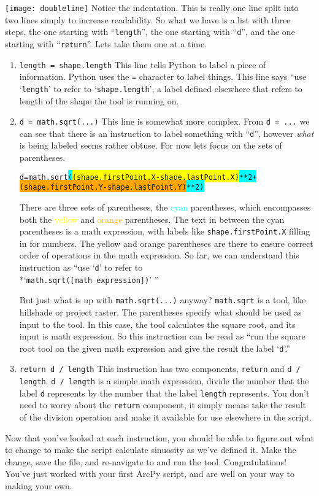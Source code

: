 \documentclass{article}
\begin{document}
\noindent
\texttt{[image: doubleline]}
Notice the indentation.  This is really one line split into two lines simply to increase readability.  So what we have is a list with three steps, the one starting with ``\verb+length+'', the one starting with ``\verb+d+'', and the one starting with ``\verb+return+''.  Lets take them one at a time.
\begin{enumerate}
    \item \verb+length = shape.length+
        This line tells Python to label a piece of information.  Python uses the \verb+=+ character to label things.  This line says ``use `\verb+length+' to refer to `\verb+shape.length+', a label defined elsewhere that refers to length of the shape the tool is running on.  
    \item \verb+d = math.sqrt(...)+
        This line is somewhat more complex.  From \verb+d = ...+ we can see that there is an instruction to label something with ``\verb+d+'', however \textit{what} is being labeled seems rather obtuse.  For now lets focus on the sets of parentheses.  
        \begin{alltt}
d = math.sqrt\colorbox{cyan}{(\colorbox{yellow}{(shape.firstPoint.X - shape.lastPoint.X)} ** 2 +}
              \colorbox{cyan}{\colorbox{orange}{(shape.firstPoint.Y - shape.lastPoint.Y)} ** 2)}
\end{alltt}
There are three sets of parentheses, the \textcolor{cyan}{cyan} parentheses, which encompasses both the \textcolor{yellow}{yellow} and \textcolor{orange}{orange} parentheses.  The text in between the cyan parentheses is a math expression, with labels like \verb+shape.firstPoint.X+ filling in for numbers.  The yellow and orange parentheses are there to ensure correct order of operations in the math expression.  
So far, we can understand this instruction as ``use `\verb+d+' to refer to \\*`\verb+math.sqrt([math expression])+' ''

But just what is up with \verb+math.sqrt(...)+ anyway?  \verb+math.sqrt+ is a tool, like hillshade or project raster.  The parentheses specify what should be used as input to the tool.  In this case, the tool calculates the square root, and its input is math expression.  So this instruction can be read as ``run the square root tool on the given math expression and give the result the label `\verb+d+'.''
    \item \verb+return d / length+
        This instruction has two components, \verb+return+ and \verb+d / length+.  \verb+d / length+ is a simple math expression, divide the number that the label \verb+d+ represents by the number that the label \verb+length+ represents.  You don't need to worry about the \verb+return+ component, it simply means take the result of the division operation and make it available for use elsewhere in the script.
\end{enumerate}
Now that you've looked at each instruction, you should be able to figure out what to change to make the script calculate sinuosity as we've defined it.  Make the change, save the file, and re-navigate to and run the tool.
Congratulations!  You've just worked with your first ArcPy script, and are well on your way to making your own.
\end{document}
